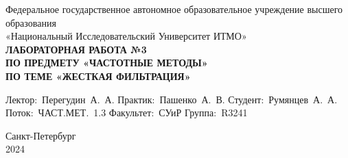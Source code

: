 \documentclass[a4paper, 16pt]{article}
\begin{document}
\begin{titlepage}

    \begin{center}
    \vfill
    
    Федеральное государственное автономное образовательное учреждение высшего образования\\
    «Национальный Исследовательский Университет ИТМО»\ \\
    
    \vfill
    {\large\bf ЛАБОРАТОРНАЯ РАБОТА №3\\
        ПО ПРЕДМЕТУ «ЧАСТОТНЫЕ МЕТОДЫ»\\
        ПО ТЕМЕ «ЖЕСТКАЯ ФИЛЬТРАЦИЯ»}
    \vfill
        
    \begin{flushright}
        \begin{minipage}{.45\textwidth}
        {
            \hbox{Лектор: Перегудин А. А.}
            \hbox{Практик: Пашенко А. В.}
            \hbox{Студент: Румянцев А. А.}
            \hbox{Поток: ЧАСТ.МЕТ. 1.3}
            \hbox{}
            \hbox{Факультет: СУиР}
            \hbox{Группа: R3241}
        }
        \end{minipage}
    \end{flushright}
    
    \vfill
            
    Санкт-Петербург\\
    2024
    \end{center}
    \end{titlepage}
    \setlength{\parskip}{1.5mm}
    
    \tableofcontents

    \newpage
\end{document}
